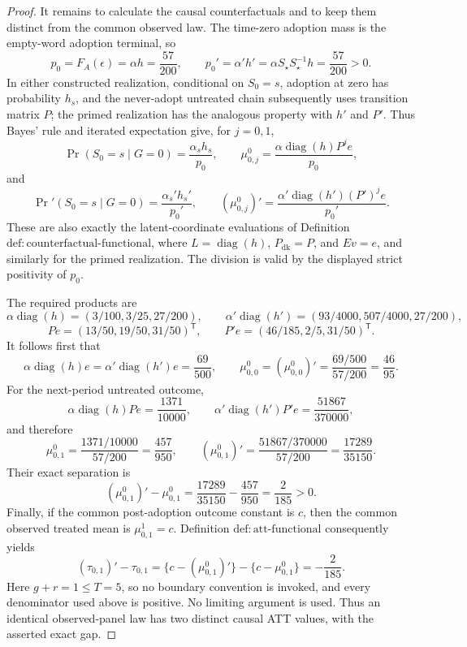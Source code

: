 \documentclass{article}
\begin{document}
\begin{proof}
It remains to calculate the causal counterfactuals and to keep them distinct from the common observed law.  The time-zero adoption mass is the empty-word adoption terminal, so
\[
 p_0=F_A(\epsilon)=\alpha h=\frac{57}{200},
 \qquad
 p_0'=\alpha'h'=\alpha S_{\star}S_{\star}^{-1}h
 =\frac{57}{200}>0.
\]
In either constructed realization, conditional on \(S_0=s\), adoption at zero has probability \(h_s\), and the never-adopt untreated chain subsequently uses transition matrix \(P\); the primed realization has the analogous property with \(h'\) and \(P'\).  Thus Bayes' rule and iterated expectation give, for \(j=0,1\),
\[
 \Pr(S_0=s\mid G=0)=\frac{\alpha_sh_s}{p_0},
 \qquad
 \mu^0_{0,j}=\frac{\alpha\operatorname{diag}(h)P^je}{p_0},
\]
and
\[
 \Pr'(S_0=s\mid G=0)=\frac{\alpha_s'h_s'}{p_0'},
 \qquad
 (\mu^0_{0,j})'=\frac{\alpha'\operatorname{diag}(h')(P')^je}{p_0'}.
\]
These are also exactly the latent-coordinate evaluations of Definition \(\mathrm{def{:}counterfactual\text{-}functional}\), where \(L=\operatorname{diag}(h)\), \(P_{\mathrm{dk}}=P\), and \(E v=e\), and similarly for the primed realization.  The division is valid by the displayed strict positivity of \(p_0\).

The required products are
\[
 \alpha\operatorname{diag}(h)
 =(3/100,3/25,27/200),
 \qquad
 \alpha'\operatorname{diag}(h')
 =(93/4000,507/4000,27/200),
\]
\[
 Pe=(13/50,19/50,31/50)^{\mathsf T},
 \qquad
 P'e=(46/185,2/5,31/50)^{\mathsf T}.
\]
It follows first that
\[
 \alpha\operatorname{diag}(h)e
 =\alpha'\operatorname{diag}(h')e
 =\frac{69}{500},
 \qquad
 \mu^0_{0,0}=(\mu^0_{0,0})'
 =\frac{69/500}{57/200}=\frac{46}{95}.
\]
For the next-period untreated outcome,
\[
 \alpha\operatorname{diag}(h)Pe=\frac{1371}{10000},
 \qquad
 \alpha'\operatorname{diag}(h')P'e=\frac{51867}{370000},
\]
and therefore
\[
 \mu^0_{0,1}=\frac{1371/10000}{57/200}=\frac{457}{950},
 \qquad
 (\mu^0_{0,1})'=\frac{51867/370000}{57/200}
 =\frac{17289}{35150}.
\]
Their exact separation is
\[
 (\mu^0_{0,1})'-\mu^0_{0,1}
 =\frac{17289}{35150}-\frac{457}{950}
 =\frac{2}{185}>0.
\]
Finally, if the common post-adoption outcome constant is \(c\), then the common observed treated mean is \(\mu^1_{0,1}=c\).  Definition \(\mathrm{def{:}att\text{-}functional}\) consequently yields
\[
 (\tau_{0,1})'-\tau_{0,1}
 =\{c-(\mu^0_{0,1})'\}-\{c-\mu^0_{0,1}\}
 =-\frac{2}{185}.
\]
Here \(g+r=1\le T=5\), so no boundary convention is invoked, and every denominator used above is positive.  No limiting argument is used.  Thus an identical observed-panel law has two distinct causal ATT values, with the asserted exact gap.
\end{proof}
\end{document}
